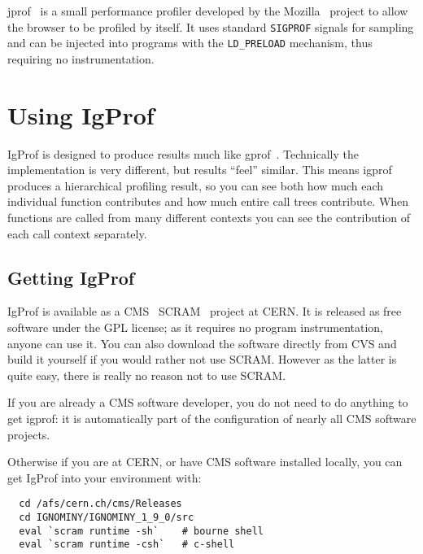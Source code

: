 \documentclass[10pt,a4paper,twocolumn]{article}
\begin{document}
jprof~\cite{jprof} is a small performance profiler developed by the
Mozilla~\cite{mozilla} project to allow the browser to be profiled by
itself.  It uses standard \verb|SIGPROF| signals for sampling and can
be injected into programs with the \verb|LD_PRELOAD| mechanism, thus
requiring no instrumentation.

\section{Using IgProf}

IgProf is designed to produce results much like gprof~\cite{gprof}.
Technically the implementation is very different, but results ``feel''
similar.  This means igprof produces a hierarchical profiling result,
so you can see both how much each individual function contributes and
how much entire call trees contribute.  When functions are called from
many different contexts you can see the contribution of each call
context separately.

\subsection{Getting IgProf}

IgProf is available as a CMS~\cite{cms} SCRAM~\cite{scram} project at
CERN.  It is released as free software under the GPL license; as it
requires no program instrumentation, anyone can use it.  You can also
download the software directly from CVS and build it yourself if you
would rather not use SCRAM.  However as the latter is quite easy,
there is really no reason not to use SCRAM.

If you are already a CMS software developer, you do not need to do
anything to get igprof: it is automatically part of the configuration
of nearly all CMS software projects.

Otherwise if you are at CERN, or have CMS software installed locally,
you can get IgProf into your environment with:

{\small\begin{verbatim}
  cd /afs/cern.ch/cms/Releases
  cd IGNOMINY/IGNOMINY_1_9_0/src
  eval `scram runtime -sh`    # bourne shell
  eval `scram runtime -csh`   # c-shell
\end{verbatim}}
\end{document}
